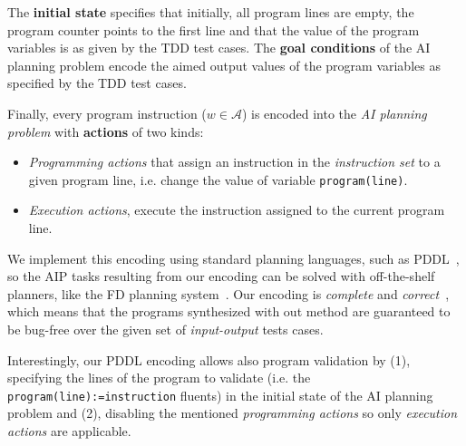 \documentclass[10pt,a4paper]{paper}
\begin{document}
The {\bf initial state} specifies that initially, all program lines are empty, the program counter points to the first line and that the value of the program variables is as given by the TDD test cases. The {\bf goal conditions} of the AI planning problem encode the aimed output values of the program variables as specified by the TDD test cases.

Finally, every program instruction ($w\in {\mathcal A}$) is encoded into the {\em AI planning problem} with {\bf actions} of two kinds:
\begin{itemize}
\item {\it Programming actions} that assign an instruction in the {\em instruction set} to a given program line, i.e. change the value of variable {\tt program(line)}.
\item {\it Execution actions}, execute the instruction assigned to the current program line.
\end{itemize}
We implement this encoding using standard planning languages, such as PDDL~\cite{fox2003pddl2}, so the AIP tasks resulting from our encoding can be solved with off-the-shelf planners, like the {\sc FD} planning system~\cite{helmert2006fast}. Our encoding is {\em complete} and {\em correct}~\cite{segovia:programs:AIJ19}, which means that the programs synthesized with out method are guaranteed to be bug-free over the given set of {\em input-output} tests cases.

Interestingly, our PDDL encoding allows also program validation by (1), specifying the lines of the program to validate (i.e. the {\tt program(line):=instruction} fluents) in the initial state of the AI planning problem and (2), disabling the mentioned {\it programming actions} so only {\it execution actions} are applicable.
\end{document}
